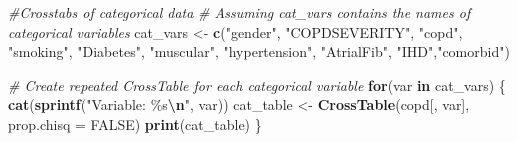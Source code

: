 \documentclass[
]{article}
\newenvironment{Shaded}{\begin{snugshade}}{\end{snugshade}}
\newcommand{\AttributeTok}[1]{\textcolor[rgb]{0.13,0.29,0.53}{#1}}
\newcommand{\CommentTok}[1]{\textcolor[rgb]{0.56,0.35,0.01}{\textit{#1}}}
\newcommand{\ConstantTok}[1]{\textcolor[rgb]{0.56,0.35,0.01}{#1}}
\newcommand{\ControlFlowTok}[1]{\textcolor[rgb]{0.13,0.29,0.53}{\textbf{#1}}}
\newcommand{\FunctionTok}[1]{\textcolor[rgb]{0.13,0.29,0.53}{\textbf{#1}}}
\newcommand{\NormalTok}[1]{#1}
\newcommand{\OtherTok}[1]{\textcolor[rgb]{0.56,0.35,0.01}{#1}}
\newcommand{\SpecialCharTok}[1]{\textcolor[rgb]{0.81,0.36,0.00}{\textbf{#1}}}
\newcommand{\StringTok}[1]{\textcolor[rgb]{0.31,0.60,0.02}{#1}}
\begin{document}
\begin{Shaded}
\begin{Highlighting}[]
\CommentTok{\#Crosstabs of categorical data}
\CommentTok{\# Assuming \textquotesingle{}cat\_vars\textquotesingle{} contains the names of categorical variables}
\NormalTok{cat\_vars }\OtherTok{\textless{}{-}} \FunctionTok{c}\NormalTok{(}\StringTok{"gender"}\NormalTok{, }\StringTok{"COPDSEVERITY"}\NormalTok{, }\StringTok{"copd"}\NormalTok{, }\StringTok{"smoking"}\NormalTok{, }\StringTok{"Diabetes"}\NormalTok{, }\StringTok{"muscular"}\NormalTok{, }\StringTok{"hypertension"}\NormalTok{, }\StringTok{"AtrialFib"}\NormalTok{, }\StringTok{"IHD"}\NormalTok{,}\StringTok{"comorbid"}\NormalTok{)  }

\CommentTok{\# Create repeated CrossTable for each categorical variable}
\ControlFlowTok{for}\NormalTok{(var }\ControlFlowTok{in}\NormalTok{ cat\_vars) \{}
  \FunctionTok{cat}\NormalTok{(}\FunctionTok{sprintf}\NormalTok{(}\StringTok{"Variable: \%s}\SpecialCharTok{\textbackslash{}n}\StringTok{"}\NormalTok{, var))  }
\NormalTok{  cat\_table }\OtherTok{\textless{}{-}} \FunctionTok{CrossTable}\NormalTok{(copd[, var], }\AttributeTok{prop.chisq =} \ConstantTok{FALSE}\NormalTok{)}
  \FunctionTok{print}\NormalTok{(cat\_table)}
\NormalTok{\}}
\end{Highlighting}
\end{Shaded}
\end{document}
